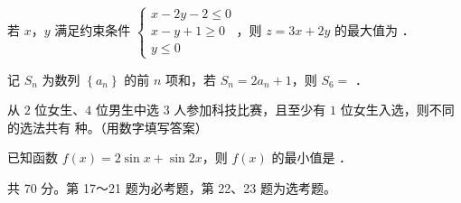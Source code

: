 \begin{question}
若 $x$，$y$ 满足约束条件 $\begin{cases}x-2y-2\le0\\ x-y+1\ge0\\ y\le0\end{cases}$，则 $z=3x+2y$ 的最大值为 \gkblank{}．

\end{question}
\begin{question}
记 $S_n$ 为数列 $\left\{a_n\right\}$ 的前 $n$ 项和，若 $S_n=2a_n+1$，则 $S_6=$ \gkblank{}．

\end{question}
\begin{question}
从 $2$ 位女生、$4$ 位男生中选 $3$ 人参加科技比赛，且至少有 $1$ 位女生入选，则不同的选法共有 \gkblank{} 种。（用数字填写答案）

\end{question}
\begin{question}
已知函数 $f(x)=2\sin x+\sin2x$，则 $f(x)$ 的最小值是 \gkblank{}．

\par\medskip

\end{question}

\begin{gktip}
共 70 分。第 17～21 题为必考题，第 22、23 题为选考题。
\end{gktip}


